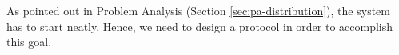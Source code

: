 



\label{sec:sys-boot-mw}
As pointed out in Problem Analysis (Section \ref{sec:pa-distribution}),
the system has
to start neatly. Hence, we need to design a protocol in order to accomplish
this goal.

